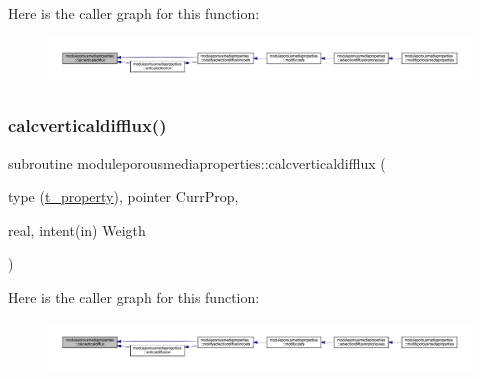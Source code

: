 Here is the caller graph for this function\+:\nopagebreak
\begin{figure}[H]
\begin{center}
\leavevmode
\includegraphics[width=350pt]{namespacemoduleporousmediaproperties_a073f545385ee87d0157436c464e871fa_icgraph}
\end{center}
\end{figure}
\mbox{\label{namespacemoduleporousmediaproperties_aaa3c9648a06189bd69f555e24fa2a81e}} 
\subsubsection{\texorpdfstring{calcverticaldifflux()}{calcverticaldifflux()}}
{\footnotesize\ttfamily subroutine moduleporousmediaproperties\+::calcverticaldifflux (\begin{DoxyParamCaption}\item[{type (\mbox{\hyperlink{structmoduleporousmediaproperties_1_1t__property}{t\+\_\+property}}), pointer}]{Curr\+Prop,  }\item[{real, intent(in)}]{Weigth }\end{DoxyParamCaption})\hspace{0.3cm}{\ttfamily [private]}}

Here is the caller graph for this function\+:\nopagebreak
\begin{figure}[H]
\begin{center}
\leavevmode
\includegraphics[width=350pt]{namespacemoduleporousmediaproperties_aaa3c9648a06189bd69f555e24fa2a81e_icgraph}
\end{center}
\end{figure}
\mbox{\label{namespacemoduleporousmediaproperties_aa89aee3f1e3ab0673669acd8126824f9}} 
